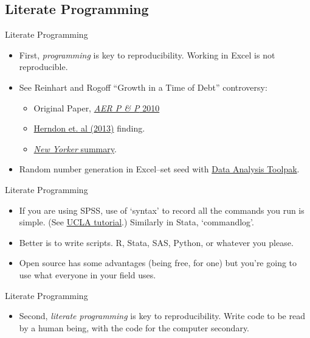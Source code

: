 \documentclass{beamer}
\begin{document}
\subsection{Literate Programming}
\begin{frame}{Literate Programming}
\begin{itemize}
\item First, \textit{programming} is key to reproducibility. Working in Excel is not reproducible.
\item See Reinhart and Rogoff ``Growth in a Time of Debt'' controversy: 
\begin{itemize}
	\item
	Original Paper, \href{https://www.aeaweb.org/articles.php?doi=10.1257/aer.100.2.573}{\textit{AER P \& P} 2010}
	\item 
	\href{http://cje.oxfordjournals.org/content/38/2/257}{Herndon et. al (2013)} finding.
	\item \href{http://www.newyorker.com/news/john-cassidy/the-reinhart-and-rogoff-controversy-a-summing-up}{\textit{New Yorker} summary}.
\end{itemize}

\item Random number generation in Excel--set seed with \href{http://www.statisticshowto.com/use-random-number-generator-excel/}{Data Analysis Toolpak}. 
\end{itemize}
\end{frame}

\begin{frame}{Literate Programming}
\begin{itemize}
\item  If you are using SPSS, use of `syntax' to record all the commands you run is simple. (See \href{http://www.ats.ucla.edu/stat/spss/seminars/spss_syntax/}{UCLA tutorial}.) Similarly in Stata, `commandlog'.

\item Better is to write scripts. R, Stata, SAS, Python, or whatever you please.

\item Open source has some advantages (being free, for one) but you're going to use what everyone in your field uses.
\end{itemize}
\end{frame}

\begin{frame}{Literate Programming}
\begin{itemize}
\item
Second, \textit{literate programming} is key to reproducibility. Write code to be read by a human being, with the code for the computer secondary.
\end{itemize}
\end{frame}
\end{document}

